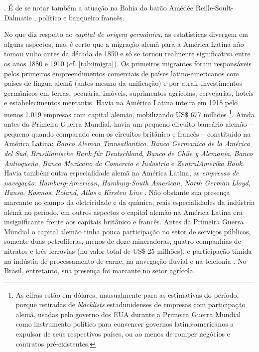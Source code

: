 \cite{somogyi_lafont_1990}. É de se notar também a atuação na Bahia do barão Amédée Reille-Soult-Dalmatie \cite[pp.~116-120]{CUNHA2011}, político e banqueiro francês.

No que diz respeito ao \textit{capital de origem germânica}, as estatísticas divergem em alguns aspectos, mas é certo que a migração alemã para a América Latina não tomou vulto antes da década de 1850 \cite[p.~65]{rippy_german_1948} e só se tornou realmente significativa entre os anos 1880 e 1910 (cf. \autoref{tab:imigra}). Os primeiros migrantes foram responsáveis pelos primeiros empreendimentos comerciais de países latino-americanos com países de língua alemã (antes mesmo da unificação) e por atrair investimentos germânicos em terras, pecuária, imóveis, suprimentos agrícolas, cervejarias, hoteis e estabelecimentos mercantis. Havia na América Latina inteira em 1918 pelo menos 1.019 empresas com capital alemão, mobilizando US\$ 677 milhões \cite[p.~64-65]{rippy_german_1948}\footnote{As cifras estão em dólares, unusualmente para as estimativas do período, porque retiradas de \textit{blacklists} estadunidenses de empresas com participação alemã, usadas pelo governo dos EUA durante a Primeira Guerra Mundial como instrumento político para convencer governos latino-americanos a expulsar de seus respectivos países, ou ao menos de romper negócios e contratos pré-existentes.}. Ainda antes da Primeira Guerra Mundial, havia um pequeno circuito bancário alemão -- pequeno quando comparado com os circuitos britânico e francês -- constituído na América Latina: \textit{Banco Aleman Transatlantico}, \textit{Banco Germanico de la América del Sud}, \textit{Brasilianische Bank für Deutschland}, \textit{Banco de Chile y Alemania}, \textit{Banco Antioqueña}, \textit{Banco Mexicano de Comercio e Industria} e \textit{ZentralAmerika Bank}. Havia também outra especialidade alemã na América Latina, as \textit{empresas de navegação}: \textit{Hamburg-American}, \textit{Hamburg-South American}, \textit{North German Lloyd}, \textit{Hansa}, \textit{Kosmos}, \textit{Roland}, \textit{Atlas} e \textit{Kirsten Line} \cite{rippy_german_1948}. Não obstante sua presença marcante no campo da eletricidade e da química, reais especialidades da indústria alemã no período, em outros aspectos o capital alemão na América Latina era insignificante frente aos capitais britânico e francês. Antes da Primeira Guerra Mundial o capital alemão tinha pouca participação no setor de serviços públicos, somente duas petrolíferas, menos de doze mineradoras, quatro companhias de nitratos e três ferrovias (no valor total de US\$ 25 milhões), e participação tímida na indústia de processamento de carne, na navegação fluvial e na telefonia \cite{rippy_german_1948}. No Brasil, entretanto, sua presença foi marcante no setor agrícola.



